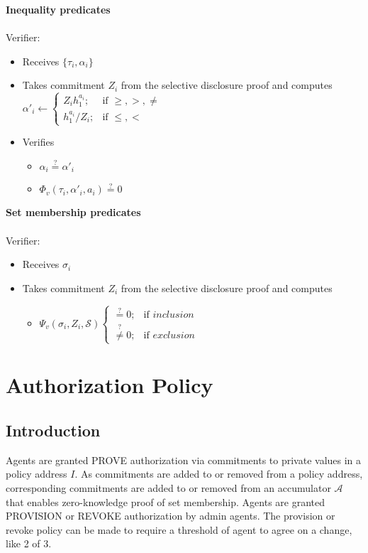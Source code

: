 \documentclass[a4paper]{article}
\begin{document}
\textbf{Inequality predicates}\\\\
Verifier:
\begin{itemize}
    \item Receives $\{\tau_i, \alpha_i\}$
    \item Takes commitment $Z_i$ from the selective disclosure proof and computes
        $\alpha'_i \leftarrow \begin{cases}
        Z_i h_1^{a_i};& \mbox{if } \geq, >, \neq\\
        h_1^{a_i}/Z_i;& \mbox{if } \leq, <
        \end{cases}$
    \item Verifies
    \begin{itemize}
        \item $\alpha_i \overset{\text{?}}{=}\alpha'_i$
        \item $\Phi_v(\tau_i, \alpha'_i, a_i)\overset{?}{=} 0$
    \end{itemize}
\end{itemize}
\textbf{Set membership predicates}\\\\
Verifier:
\begin{itemize}
    \item Receives $\sigma_i$
    \item Takes commitment $Z_i$ from the selective disclosure proof and computes
    \begin{itemize}
        \item $\Psi_v(\sigma_i, Z_i, \mathcal{S}) \begin{cases}
        \overset{?}{=} 0;&\mbox{if } inclusion\\
        \overset{?}{\neq} 0;&\mbox{if } exclusion
        \end{cases}$
    \end{itemize}
\end{itemize}
\section{Authorization Policy}
\subsection{Introduction}

Agents are granted PROVE authorization via commitments to private values in a policy address $I$.
As commitments are added to or removed from a policy address, corresponding commitments are added to
or removed from an accumulator $\mathcal{A}$ that enables zero-knowledge proof of set membership.
Agents are granted PROVISION or REVOKE authorization by admin agents.
The provision or revoke policy can be made to require a threshold of agent to agree on a change, like 2 of 3.
\end{document}

